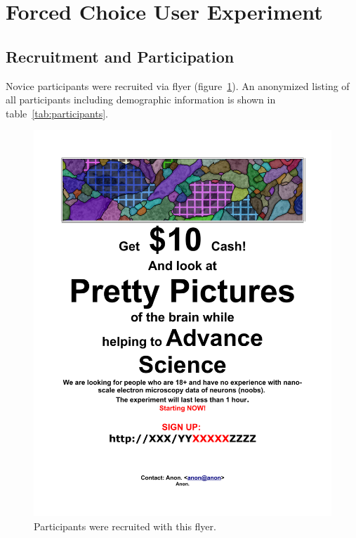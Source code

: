 

\section{Forced Choice User Experiment}

\subsection{Recruitment and Participation}

Novice participants were recruited via flyer (figure~\ref{fig:flyer}). An anonymized listing of all participants including demographic information is shown in table~\ref{tab:participants}.

\begin{figure}[t]
\centering
\includegraphics[width=\linewidth]{gfx/flyer_anon.pdf}
\caption{Participants were recruited with this flyer.}
\label{fig:flyer}
\end{figure}

